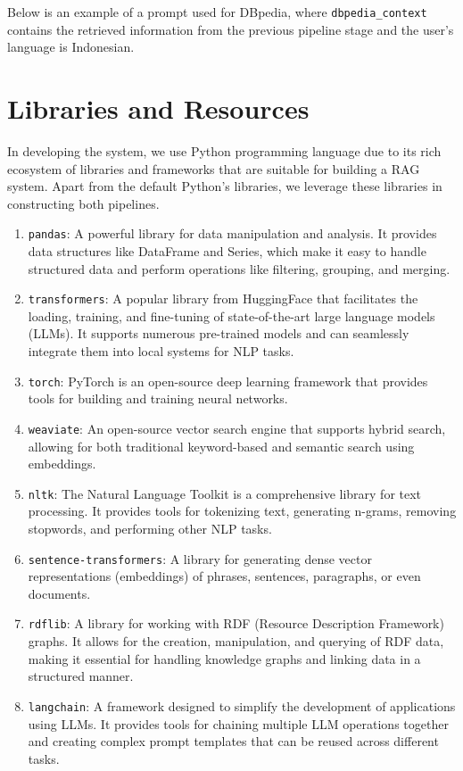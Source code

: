 Below is an example of a prompt used for DBpedia, where \texttt{dbpedia\_context} contains the retrieved information from the previous pipeline stage and the user's language is Indonesian.

\promptNine

\section{Libraries and Resources}
\label{libraries-resources}
In developing the system, we use Python programming language due to its rich ecosystem of libraries and frameworks that are suitable for building a RAG system. Apart from the default Python's libraries, we leverage these libraries in constructing both pipelines.
\begin{enumerate}
    \item \texttt{pandas}: A powerful library for data manipulation and analysis. It provides data structures like DataFrame and Series, which make it easy to handle structured data and perform operations like filtering, grouping, and merging.
    \item \texttt{transformers}: A popular library from HuggingFace that facilitates the loading, training, and fine-tuning of state-of-the-art large language models (LLMs). It supports numerous pre-trained models and can seamlessly integrate them into local systems for NLP tasks.
    \item \texttt{torch}: PyTorch is an open-source deep learning framework that provides tools for building and training neural networks. 
    \item \texttt{weaviate}: An open-source vector search engine that supports hybrid search, allowing for both traditional keyword-based and semantic search using embeddings.
    \item \texttt{nltk}: The Natural Language Toolkit is a comprehensive library for text processing. It provides tools for tokenizing text, generating n-grams, removing stopwords, and performing other NLP tasks.
    \item \texttt{sentence-transformers}: A library for generating dense vector representations (embeddings) of phrases, sentences, paragraphs, or even documents.
    \item \texttt{rdflib}: A library for working with RDF (Resource Description Framework) graphs. It allows for the creation, manipulation, and querying of RDF data, making it essential for handling knowledge graphs and linking data in a structured manner.
    \item \texttt{langchain}: A framework designed to simplify the development of applications using LLMs. It provides tools for chaining multiple LLM operations together and creating complex prompt templates that can be reused across different tasks.

\end{enumerate}
